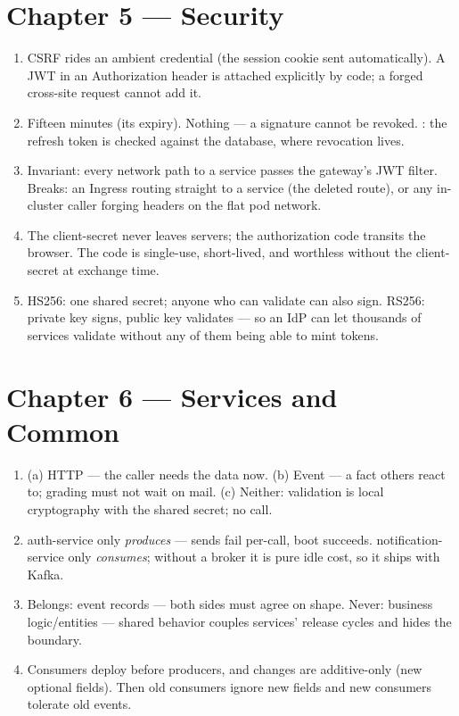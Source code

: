 \section*{Chapter 5 --- Security}
\begin{enumerate}
  \item CSRF rides an ambient credential (the session cookie sent
  automatically). A JWT in an Authorization header is attached
  explicitly by code; a forged cross-site request cannot add it.
  \item Fifteen minutes (its expiry). Nothing --- a signature cannot be
  revoked. : the refresh token is checked against the
  database, where revocation lives.
  \item Invariant: every network path to a service passes the
  gateway's JWT filter. Breaks: an Ingress routing straight to a
  service (the deleted  route), or any in-cluster
  caller forging headers on the flat pod network.
  \item The client-secret never leaves servers; the authorization
  code transits the browser. The code is single-use, short-lived, and
  worthless without the client-secret at exchange time.
  \item HS256: one shared secret; anyone who can validate can also
  sign. RS256: private key signs, public key validates --- so an IdP
  can let thousands of services validate without any of them being
  able to mint tokens.
\end{enumerate}

\section*{Chapter 6 --- Services and Common}
\begin{enumerate}
  \item (a) HTTP --- the caller needs the data now. (b) Event --- a
  fact others react to; grading must not wait on mail. (c) Neither:
  validation is local cryptography with the shared secret; no call.
  \item auth-service only \emph{produces} --- sends fail per-call,
  boot succeeds. notification-service only \emph{consumes}; without a
  broker it is pure idle cost, so it ships with Kafka.
  \item Belongs: event records --- both sides must agree on shape.
  Never: business logic/entities --- shared behavior couples services'
  release cycles and hides the boundary.
  \item Consumers deploy before producers, and changes are
  additive-only (new optional fields). Then old consumers ignore new
  fields and new consumers tolerate old events.
\end{enumerate}

